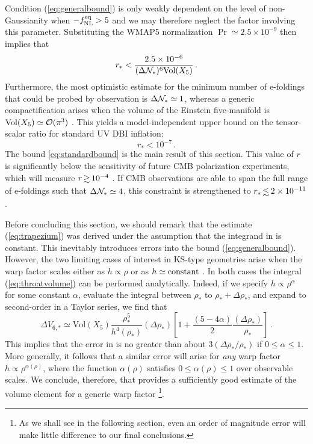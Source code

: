 Condition (\ref{eq:generalbound}) is 
only weakly dependent on the level of non-Gaussianity 
when $-f_{\mathrm{NL}}^{\mathrm{eq}} > 5$ and we may therefore neglect the 
factor involving this parameter. 
Substituting the WMAP5 normalization 
$\Pr \simeq 2.5 \times 10^{-9}$ then implies that
%  
\begin{equation}
\label{eq:upperbound}
r_{*} < \frac{2.5\times 10^{-6}}{( \Delta \mathcal{N}_*)^6 \mathrm{Vol}(X_5)} \,.
\end{equation}
% 
Furthermore, the most optimistic 
estimate for the minimum number of e-foldings that could be 
probed by observation is $\Delta \mathcal{N}_{*} \simeq 1$, whereas
a generic compactification arises when 
the volume of the Einstein five-manifold is $\mathrm{Vol}(X_5) 
\simeq {\cal{O}} (\pi^3)$ \cite{ks}. This yields a model-independent 
upper bound on the tensor-scalar ratio for standard UV DBI inflation:
%    
\begin{equation}
\label{eq:standardbound}
r_* < 10^{-7} \,.
\end{equation}
% 
The bound \eqref{eq:standardbound} is the main result of this section.
This value of $r$ is significantly below the sensitivity 
of future CMB polarization experiments, which will measure 
${r} \, {\gsim} \, 10^{-4}$ \cite{Baumann:2008aq,vpj}. 
If CMB  
observations are able to span the full range of e-foldings such that
$\Delta \mathcal{N}_* \simeq 4$, this constraint is strengthened to 
${r_*} \, {\lsim} \, {2 \times 10^{-11}}$.


Before concluding this section, we should remark that 
the estimate (\ref{eq:trapezium}) was derived under the assumption  
that the integrand in   
is constant. This inevitably introduces errors into the bound
(\ref{eq:generalbound}). However, the two limiting cases of interest 
in KS-type geometries arise 
when the warp factor scales either as $h \propto \rho$
or as $h \simeq {\rm constant}$ \cite{ks,kt}. In both cases
the integral (\ref{eq:throatvolume}) can be performed analytically. 
Indeed, if we specify $h \propto \rho^{\alpha}$ for some constant $\alpha$,  
evaluate the integral between $\rho_{*}$ 
to $\rho_{*}+\Delta \rho_{*}$, and expand to second-order in a 
Taylor series, we find that  
% 
\begin{equation}
\label{eq:limits}
\Delta V_{6,*} \simeq \mathrm{Vol}(X_5) \frac{\rho^5_{*}}{h^{4} 
(\rho_{*} )}(\Delta \rho_*) 
\left[ 1 +\frac{(5-4 \alpha )}{2} 
\frac{(\Delta \rho_*)}{\rho_{*}} \right]  \,.
\end{equation}
% 
This implies that the error in  
is no greater than 
about $3 (\Delta \rho_* / \rho_*)$ if  
$0 \le \alpha \le 1$. More generally, it follows that a similar
error will arise for {\em any} warp factor 
$h \propto \rho^{\alpha (\rho )}$, where the function 
$\alpha (\rho)$ satisfies $0 \le \alpha (\rho ) \le 1$ 
over observable scales. 
We conclude, therefore, that  
provides a sufficiently good estimate of the volume element  
for a generic warp factor
\footnote{As we shall see in the following section, 
even an order of magnitude error will make little 
difference to our final conclusions.}.  
% 
% 
% 
% 
